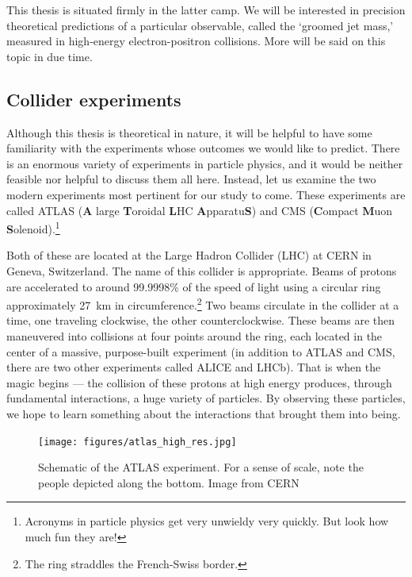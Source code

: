 \documentclass[../thesis.tex]{subfiles}
\begin{document}
	This thesis is situated firmly in the latter camp. We will be interested in precision theoretical predictions of a particular observable, called the `groomed jet mass,' measured in high-energy electron-positron collisions. More will be said on this topic in due time.


\subsection{Collider experiments}
	Although this thesis is theoretical in nature, it will be helpful to have some familiarity with the experiments whose outcomes we would like to predict. There is an enormous variety of experiments in particle physics, and it would be neither feasible nor helpful to discuss them all here. Instead, let us examine the two modern experiments most pertinent for our study to come. These experiments are called ATLAS (\textbf{A} large \textbf{T}oroidal \textbf{L}HC \textbf{A}pparatu\textbf{S}) and CMS (\textbf{C}ompact \textbf{M}uon \textbf{S}olenoid).\footnote{Acronyms in particle physics get very unwieldy very quickly. But look how much fun they are!} 

	Both of these are located at the Large Hadron Collider (LHC) at CERN in Geneva, Switzerland. The name of this collider is appropriate. Beams of protons are accelerated to around 99.9998\% of the speed of light using a circular ring approximately \SI{27}{\kilo\metre} in circumference.\footnote{The ring straddles the French-Swiss border.} Two beams circulate in the collider at a time, one traveling clockwise, the other counterclockwise. These beams are then maneuvered into collisions at four points around the ring, each located in the center of a massive, purpose-built experiment (in addition to ATLAS and CMS, there are two other experiments called ALICE and LHCb). That is when the magic begins --- the collision of these protons at high energy produces, through fundamental interactions, a huge variety of particles. By observing these particles, we hope to learn something about the interactions that brought them into being.

	\begin{figure}
	\begin{center}
		\texttt{[image: figures/atlas\_high\_res.jpg]}
		\caption{\label{intro-fig:atlas diagram}Schematic of the ATLAS experiment. For a sense of scale, note the people depicted along the bottom. Image from CERN \cite{cern_ac_layout_1998}}
	\end{center}
	\end{figure}
\end{document}

